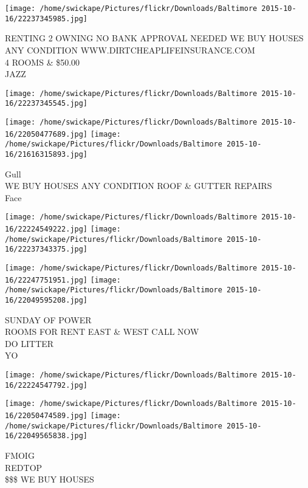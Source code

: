 \documentclass[10pt,letterpaper]{article}
\begin{document}
\texttt{[image: /home/swickape/Pictures/flickr/Downloads/Baltimore 2015-10-16/22237345985.jpg]}

RENTING 2 OWNING NO BANK APPROVAL NEEDED WE BUY HOUSES ANY CONDITION WWW.DIRTCHEAPLIFEINSURANCE.COM\\
4 ROOMS \& \$50.00\\
JAZZ\\
\pagebreak

\texttt{[image: /home/swickape/Pictures/flickr/Downloads/Baltimore 2015-10-16/22237345545.jpg]}

\vspace{0.25in}
\texttt{[image: /home/swickape/Pictures/flickr/Downloads/Baltimore 2015-10-16/22050477689.jpg]}
\texttt{[image: /home/swickape/Pictures/flickr/Downloads/Baltimore 2015-10-16/21616315893.jpg]}

Gull\\
WE BUY HOUSES ANY CONDITION ROOF \& GUTTER REPAIRS\\
Face\\
\pagebreak

\texttt{[image: /home/swickape/Pictures/flickr/Downloads/Baltimore 2015-10-16/22224549222.jpg]}
\texttt{[image: /home/swickape/Pictures/flickr/Downloads/Baltimore 2015-10-16/22237343375.jpg]}

\texttt{[image: /home/swickape/Pictures/flickr/Downloads/Baltimore 2015-10-16/22247751951.jpg]}
\texttt{[image: /home/swickape/Pictures/flickr/Downloads/Baltimore 2015-10-16/22049595208.jpg]}

SUNDAY OF POWER\\
ROOMS FOR RENT EAST \& WEST CALL NOW\\
DO LITTER\\
YO\\
\pagebreak

\texttt{[image: /home/swickape/Pictures/flickr/Downloads/Baltimore 2015-10-16/22224547792.jpg]}

\vspace{0.25in}
\texttt{[image: /home/swickape/Pictures/flickr/Downloads/Baltimore 2015-10-16/22050474589.jpg]}
\texttt{[image: /home/swickape/Pictures/flickr/Downloads/Baltimore 2015-10-16/22049565838.jpg]}

FMOIG\\
REDTOP\\
\$\$\$ WE BUY HOUSES\\
\pagebreak
\end{document}
